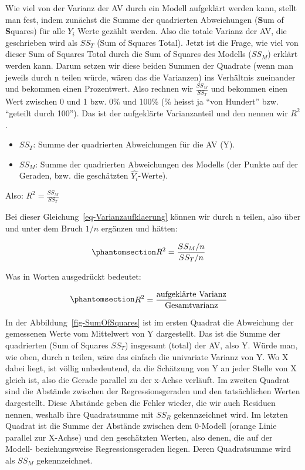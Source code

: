 \documentclass[
  10pt,
  letterpaper,
  a4paper, twoside]{scrreprt}
\providecommand{\tightlist}{%
  \setlength{\itemsep}{0pt}\setlength{\parskip}{0pt}}\usepackage{longtable,booktabs,array}
\begin{document}
Wie viel von der Varianz der AV durch ein Modell aufgeklärt werden kann,
stellt man fest, indem zunächst die Summe der quadrierten Abweichungen
(\textbf{S}um of \textbf{S}quares) für alle \(Y_i\) Werte gezählt
werden. Also die totale Varianz der AV, die geschrieben wird als
\(SS_T\) (Sum of Squares Total). Jetzt ist die Frage, wie viel von
dieser Sum of Squares Total durch die Sum of Squares des Modells
(\(SS_M\)) erklärt werden kann. Darum setzen wir diese beiden Summen der
Quadrate (wenn man jeweils durch n teilen würde, wären das die
Varianzen) ins Verhältnis zueinander und bekommen einen Prozentwert.
Also rechnen wir \(\frac{SS_M}{SS_T}\) und bekommen einen Wert zwischen
0 und 1 bzw. 0\% und 100\% (\% heisst ja \enquote{von Hundert} bzw.
\enquote{geteilt durch 100}). Das ist der aufgeklärte Varianzanteil und
den nennen wir \(R^2\).

\begin{itemize}
\tightlist
\item
  \(SS_T\): Summe der quadrierten Abweichungen für die AV (Y).
\item
  \(SS_M\): Summe der quadrierten Abweichungen des Modells (der Punkte
  auf der Geraden, bzw. die geschätzten \(\hat{Y_i}\)-Werte).
\end{itemize}

Also: \(R^2 = \frac{SS_M}{SS_T}\)

Bei dieser Gleichung~\ref{eq-Varianzaufklaerung} können wir durch n
teilen, also über und unter dem Bruch \(1/n\) ergänzen und hätten:

\begin{equation}\phantomsection\label{eq-Varianzaufklaerung}{
\begin{aligned}
 R^2 & = \frac{SS_M/n}{SS_T/n}
\end{aligned}
}\end{equation}

Was in Worten ausgedrückt bedeutet:

\begin{equation}\phantomsection\label{eq-Varianzaufklaerung-verbal}{
\begin{aligned}
 R^2 & = \frac{\text{aufgeklärte Varianz}}{\text{Gesamtvarianz}}
\end{aligned}
}\end{equation}

In der Abbildung~\ref{fig-SumOfSquares} ist im ersten Quadrat die
Abweichung der gemessenen Werte vom Mittelwert von Y dargestellt. Das
ist die Summe der quadrierten (Sum of Squares \(SS_T\)) insgesamt
(total) der AV, also Y. Würde man, wie oben, durch n teilen, wäre das
einfach die univariate Varianz von Y. Wo X dabei liegt, ist völlig
unbedeutend, da die Schätzung von Y an jeder Stelle von X gleich ist,
also die Gerade parallel zu der x-Achse verläuft. Im zweiten Quadrat
sind die Abstände zwischen der Regressionsgeraden und den tatsächlichen
Werten dargestellt. Diese Abstände geben die Fehler wieder, die wir auch
Residuen nennen, weshalb ihre Quadratsumme mit \(SS_R\) gekennzeichnet
wird. Im letzten Quadrat ist die Summe der Abstände zwischen dem
0-Modell (orange Linie parallel zur X-Achse) und den geschätzten Werten,
also denen, die auf der Modell- beziehungsweise Regressionsgeraden
liegen. Deren Quadratsumme wird als \(SS_M\) gekennzeichnet.
\end{document}
